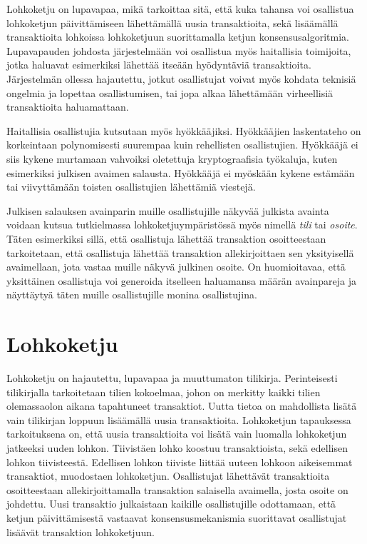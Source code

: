 Lohkoketju on lupavapaa, mikä tarkoittaa sitä, että kuka tahansa voi osallistua lohkoketjun päivittämiseen lähettämällä uusia transaktioita, sekä lisäämällä transaktioita lohkoissa lohkoketjuun suorittamalla ketjun konsensusalgoritmia. Lupavapauden johdosta järjestelmään voi osallistua myös haitallisia toimijoita, jotka haluavat esimerkiksi lähettää itseään hyödyntäviä transaktioita. Järjestelmän ollessa hajautettu, jotkut osallistujat voivat myös kohdata teknisiä ongelmia ja lopettaa osallistumisen, tai jopa alkaa lähettämään virheellisiä transaktioita haluamattaan.

Haitallisia osallistujia kutsutaan myös hyökkääjiksi. Hyökkääjien laskentateho on korkeintaan polynomisesti suurempaa kuin rehellisten osallistujien. Hyökkääjä ei siis kykene murtamaan vahvoiksi oletettuja kryptograafisia työkaluja, kuten esimerkiksi julkisen avaimen salausta. Hyökkääjä ei myöskään kykene estämään tai viivyttämään toisten osallistujien lähettämiä viestejä.

Julkisen salauksen avainparin muille osallistujille näkyvää julkista avainta voidaan kutsua tutkielmassa lohkoketjuympäristössä myös nimellä \textit{tili} tai \textit{osoite}. Täten esimerkiksi sillä, että osallistuja lähettää transaktion osoitteestaan tarkoitetaan, että osallistuja lähettää transaktion allekirjoittaen sen yksityisellä avaimellaan, jota vastaa muille näkyvä julkinen osoite. On huomioitavaa, että yksittäinen osallistuja voi generoida itselleen haluamansa määrän avainpareja ja näyttäytyä täten muille osallistujille monina osallistujina.

\section{Lohkoketju}

Lohkoketju on hajautettu, lupavapaa ja muuttumaton tilikirja. Perinteisesti tilikirjalla tarkoitetaan tilien kokoelmaa, johon on merkitty kaikki tilien olemassaolon aikana tapahtuneet transaktiot. Uutta tietoa on mahdollista lisätä vain tilikirjan loppuun lisäämällä uusia transaktioita. Lohkoketjun tapauksessa tarkoituksena on, että uusia  transaktioita voi lisätä vain luomalla lohkoketjun jatkeeksi uuden lohkon. Tiivistäen lohko koostuu transaktioista, sekä edellisen lohkon tiivisteestä. Edellisen lohkon tiiviste liittää uuteen lohkoon aikeisemmat transaktiot, muodostaen lohkoketjun. Osallistujat lähettävät transaktioita osoitteestaan allekirjoittamalla transaktion salaisella avaimella, josta osoite on johdettu. Uusi transaktio julkaistaan kaikille osallistujille odottamaan, että ketjun päivittämisestä vastaavat konsensusmekanismia suorittavat osallistujat lisäävät transaktion lohkoketjuun.


